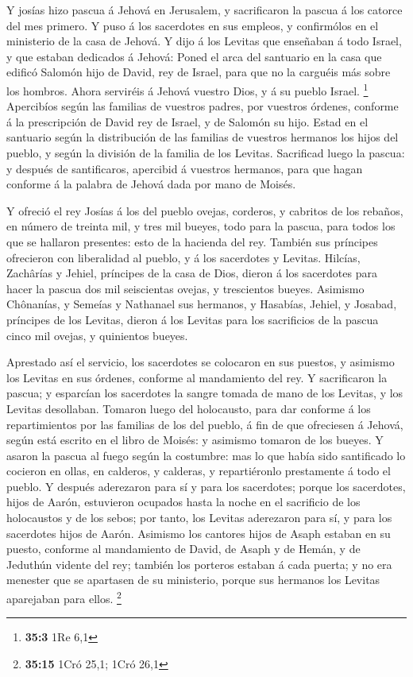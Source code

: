  Y josías hizo pascua á Jehová en Jerusalem, y sacrificaron
la pascua á los catorce del mes primero.  Y puso á los
sacerdotes en sus empleos, y confirmólos en el ministerio de la casa de
Jehová.  Y dijo á los Levitas que enseñaban á todo Israel, y
que estaban dedicados á Jehová: Poned el arca del santuario en la casa
que edificó Salomón hijo de David, rey de Israel, para que no la
carguéis más sobre los hombros. Ahora serviréis á Jehová vuestro Dios, y
á su pueblo Israel. \footnote{\textbf{35:3} 1Re 6,1} 
Apercibíos según las familias de vuestros padres, por vuestros órdenes,
conforme á la prescripción de David rey de Israel, y de Salomón su hijo.
 Estad en el santuario según la distribución de las familias
de vuestros hermanos los hijos del pueblo, y según la división de la
familia de los Levitas.  Sacrificad luego la pascua: y
después de santificaros, apercibid á vuestros hermanos, para que hagan
conforme á la palabra de Jehová dada por mano de Moisés.

 Y ofreció el rey Josías á los del pueblo ovejas, corderos,
y cabritos de los rebaños, en número de treinta mil, y tres mil bueyes,
todo para la pascua, para todos los que se hallaron presentes: esto de
la hacienda del rey.  También sus príncipes ofrecieron con
liberalidad al pueblo, y á los sacerdotes y Levitas. Hilcías, Zachârías
y Jehiel, príncipes de la casa de Dios, dieron á los sacerdotes para
hacer la pascua dos mil seiscientas ovejas, y trescientos bueyes.
 Asimismo Chônanías, y Semeías y Nathanael sus hermanos, y
Hasabías, Jehiel, y Josabad, príncipes de los Levitas, dieron á los
Levitas para los sacrificios de la pascua cinco mil ovejas, y quinientos
bueyes.

 Aprestado así el servicio, los sacerdotes se colocaron en
sus puestos, y asimismo los Levitas en sus órdenes, conforme al
mandamiento del rey.  Y sacrificaron la pascua; y esparcían
los sacerdotes la sangre tomada de mano de los Levitas, y los Levitas
desollaban.  Tomaron luego del holocausto, para dar
conforme á los repartimientos por las familias de los del pueblo, á fin
de que ofreciesen á Jehová, según está escrito en el libro de Moisés: y
asimismo tomaron de los bueyes.  Y asaron la pascua al
fuego según la costumbre: mas lo que había sido santificado lo cocieron
en ollas, en calderos, y calderas, y repartiéronlo prestamente á todo el
pueblo.  Y después aderezaron para sí y para los
sacerdotes; porque los sacerdotes, hijos de Aarón, estuvieron ocupados
hasta la noche en el sacrificio de los holocaustos y de los sebos; por
tanto, los Levitas aderezaron para sí, y para los sacerdotes hijos de
Aarón.  Asimismo los cantores hijos de Asaph estaban en su
puesto, conforme al mandamiento de David, de Asaph y de Hemán, y de
Jeduthún vidente del rey; también los porteros estaban á cada puerta; y
no era menester que se apartasen de su ministerio, porque sus hermanos
los Levitas aparejaban para ellos. \footnote{\textbf{35:15} 1Cró 25,1;
  1Cró 26,1}

